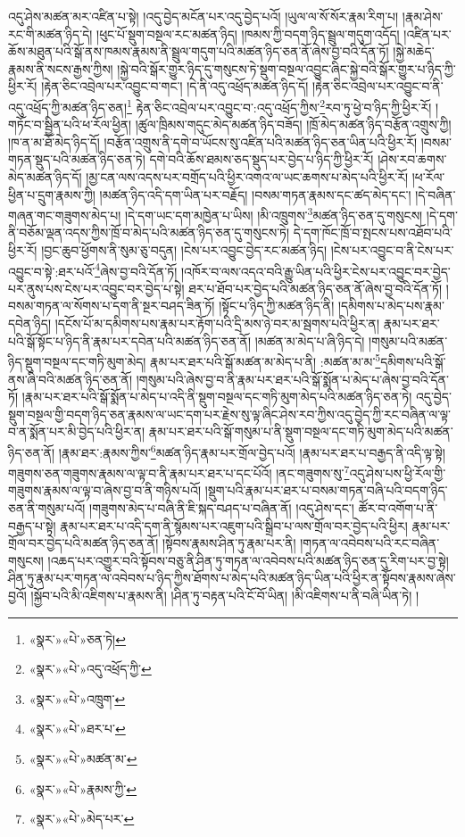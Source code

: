 འདུ་ཤེས་མཚན་མར་འཛིན་པ་སྟེ། །འདུ་བྱེད་མངོན་པར་འདུ་བྱེད་པའོ། །ཡུལ་ལ་སོ་སོར་རྣམ་རིག་པ། །རྣམ་ཤེས་རང་གི་མཚན་ཉིད་དེ། །ཕུང་པོ་སྡུག་བསྔལ་རང་མཚན་ཉིད། །ཁམས་ཀྱི་བདག་ཉིད་སྦྲུལ་གདུག་འདོད། །འཛིན་པར་ཆོས་མཐུན་པའི་སྒོ་ནས་ཁམས་རྣམས་ནི་སྦྲུལ་གདུག་པའི་མཚན་ཉིད་ཅན་ནོ་ཞེས་བྱ་བའི་དོན་ཏོ། །སྐྱེ་མཆེད་རྣམས་ནི་སངས་རྒྱས་ཀྱིས། །སྐྱེ་བའི་སྒོར་གྱུར་ཉིད་དུ་གསུངས་ཏེ་སྡུག་བསྔལ་འབྱུང་ཞིང་སྐྱེ་བའི་སྒོར་གྱུར་པ་ཉིད་ཀྱི་ཕྱིར་རོ། །རྟེན་ཅིང་འབྲེལ་པར་འབྱུང་བ་གང་། །དེ་ནི་འདུ་འཕྲོད་མཚན་ཉིད་དོ། །རྟེན་ཅིང་འབྲེལ་པར་འབྱུང་བ་ནི་འདུ་འཕྲོད་ཀྱི་མཚན་ཉིད་ཅན།\footnote{«སྣར་»«པེ་»ཅན་ཏེ།} རྟེན་ཅིང་འབྲེལ་པར་འབྱུང་བ་:འདུ་འཕྲོད་ཀྱིས་\footnote{«སྣར་»«པེ་»འདུ་འཕྲོད་ཀྱི་}རབ་ཏུ་ཕྱེ་བ་ཉིད་ཀྱི་ཕྱིར་རོ། །གཏོང་བ་སྦྱིན་པའི་ཕ་རོལ་ཕྱིན། །ཚུལ་ཁྲིམས་གདུང་མེད་མཚན་ཉིད་བཟོད། །ཁྲོ་མེད་མཚན་ཉིད་བརྩོན་འགྲུས་ཀྱི། །ཁ་ན་མ་ཐོ་མེད་ཉིད་དོ། །བརྩོན་འགྲུས་ནི་དགེ་བ་ཡོངས་སུ་འཛིན་པའི་མཚན་ཉིད་ཅན་ཡིན་པའི་ཕྱིར་རོ། །བསམ་གཏན་སྡུད་པའི་མཚན་ཉིད་ཅན་ཏེ། དགེ་བའི་ཆོས་ཐམས་ཅད་སྡུད་པར་བྱེད་པ་ཉིད་ཀྱི་ཕྱིར་རོ། །ཤེས་རབ་ཆགས་མེད་མཚན་ཉིད་དོ། །མྱ་ངན་ལས་འདས་པར་བགྲོད་པའི་ཕྱིར་འགའ་ལ་ཡང་ཆགས་པ་མེད་པའི་ཕྱིར་རོ། །ཕ་རོལ་ཕྱིན་པ་དྲུག་རྣམས་ཀྱི། །མཚན་ཉིད་འདི་དག་ཡིན་པར་བརྗོད། །བསམ་གཏན་རྣམས་དང་ཚད་མེད་དང་། །དེ་བཞིན་གཞན་གང་གཟུགས་མེད་པ། །དེ་དག་ཡང་དག་མཁྱེན་པ་ཡིས། །མི་འཁྲུགས་\footnote{«སྣར་»«པེ་»འཁྲུག་}མཚན་ཉིད་ཅན་དུ་གསུངས། །དེ་དག་ནི་བཅོམ་ལྡན་འདས་ཀྱིས་ཁྲོ་བ་མེད་པའི་མཚན་ཉིད་ཅན་དུ་གསུངས་ཏེ། དེ་དག་ཁོང་ཁྲོ་བ་སྤངས་པས་འཐོབ་པའི་ཕྱིར་རོ། །བྱང་ཆུབ་ཕྱོགས་ནི་སུམ་ཅུ་བདུན། །ངེས་པར་འབྱུང་བྱེད་རང་མཚན་ཉིད། །ངེས་པར་འབྱུང་བ་ནི་ངེས་པར་འབྱུང་བ་སྟེ་:ཐར་པའོ་\footnote{«སྣར་»«པེ་»ཐར་པ་}ཞེས་བྱ་བའི་དོན་ཏོ། །འཁོར་བ་ལས་འདའ་བའི་རྒྱུ་ཡིན་པའི་ཕྱིར་ངེས་པར་འབྱུང་བར་བྱེད་པར་ནུས་པས་ངེས་པར་འབྱུང་བར་བྱེད་པ་སྟེ། ཐར་པ་ཐོབ་པར་བྱེད་པའི་མཚན་ཉིད་ཅན་ནོ་ཞེས་བྱ་བའི་དོན་ཏོ། །བསམ་གཏན་ལ་སོགས་པ་དག་ནི་སྔར་བཤད་ཟིན་ཏོ། །སྟོང་པ་ཉིད་ཀྱི་མཚན་ཉིད་ནི། །དམིགས་པ་མེད་པས་རྣམ་དབེན་ཉིད། །དངོས་པོ་མ་དམིགས་པས་རྣམ་པར་རྟོག་པའི་དྲི་མས་ཉེ་བར་མ་སྦགས་པའི་ཕྱིར་ན། རྣམ་པར་ཐར་པའི་སྒོ་སྟོང་པ་ཉིད་ནི་རྣམ་པར་དབེན་པའི་མཚན་ཉིད་ཅན་ནོ། །མཚན་མ་མེད་པ་ཞི་ཉིད་དེ། །གསུམ་པའི་མཚན་ཉིད་སྡུག་བསྔལ་དང་གཏི་མུག་མེད། རྣམ་པར་ཐར་པའི་སྒོ་མཚན་མ་མེད་པ་ནི། :མཚན་མ་མ་\footnote{«སྣར་»«པེ་»མཚན་མ་}དམིགས་པའི་སྒོ་ནས་ཞི་བའི་མཚན་ཉིད་ཅན་ནོ། །གསུམ་པའི་ཞེས་བྱ་བ་ནི་རྣམ་པར་ཐར་པའི་སྒོ་སྨོན་པ་མེད་པ་ཞེས་བྱ་བའི་དོན་ཏོ། །རྣམ་པར་ཐར་པའི་སྒོ་སྨོན་པ་མེད་པ་འདི་ནི་སྡུག་བསྔལ་དང་གཏི་མུག་མེད་པའི་མཚན་ཉིད་ཅན་ཏེ། འདུ་བྱེད་སྡུག་བསྔལ་གྱི་བདག་ཉིད་ཅན་རྣམས་ལ་ཡང་དག་པར་རྗེས་སུ་ལྟ་ཞིང་ཤེས་རབ་ཀྱིས་འདུ་བྱེད་ཀྱི་རང་བཞིན་ལ་ལྟ་བ་ན་སྨོན་པར་མི་བྱེད་པའི་ཕྱིར་ན། རྣམ་པར་ཐར་པའི་སྒོ་གསུམ་པ་ནི་སྡུག་བསྔལ་དང་གཏི་མུག་མེད་པའི་མཚན་ཉིད་ཅན་ནོ། །རྣམ་ཐར་:རྣམས་ཀྱིས་\footnote{«སྣར་»«པེ་»རྣམས་ཀྱི་}མཚན་ཉིད་རྣམ་པར་གྲོལ་བྱེད་པའོ། །རྣམ་པར་ཐར་པ་བརྒྱད་ནི་འདི་ལྟ་སྟེ། གཟུགས་ཅན་གཟུགས་རྣམས་ལ་ལྟ་བ་ནི་རྣམ་པར་ཐར་པ་དང་པོའོ། །ནང་གཟུགས་སུ་\footnote{«སྣར་»«པེ་»མེད་པར་}འདུ་ཤེས་པས་ཕྱི་རོལ་གྱི་གཟུགས་རྣམས་ལ་ལྟ་བ་ཞེས་བྱ་བ་ནི་གཉིས་པའོ། །སྡུག་པའི་རྣམ་པར་ཐར་པ་བསམ་གཏན་བཞི་པའི་བདག་ཉིད་ཅན་ནི་གསུམ་པའོ། །གཟུགས་མེད་པ་བཞི་ནི་ཇི་སྐད་བཤད་པ་བཞིན་ནོ། །འདུ་ཤེས་དང་། ཚོར་བ་འགོག་པ་ནི་བརྒྱད་པ་སྟེ། རྣམ་པར་ཐར་པ་འདི་དག་ནི་སྙོམས་པར་འཇུག་པའི་སྒྲིབ་པ་ལས་གྲོལ་བར་བྱེད་པའི་ཕྱིར། རྣམ་པར་གྲོལ་བར་བྱེད་པའི་མཚན་ཉིད་ཅན་ནོ། །སྟོབས་རྣམས་ཤིན་ཏུ་རྣམ་པར་ནི། །གཏན་ལ་འབེབས་པའི་རང་བཞིན་གསུངས། །འཆད་པར་འགྱུར་བའི་སྟོབས་བཅུ་ནི་ཤིན་ཏུ་གཏན་ལ་འབེབས་པའི་མཚན་ཉིད་ཅན་དུ་རིག་པར་བྱ་སྟེ། ཤིན་ཏུ་རྣམ་པར་གཏན་ལ་འབེབས་པ་ཉིད་ཀྱིས་ཐོགས་པ་མེད་པའི་མཚན་ཉིད་ཡིན་པའི་ཕྱིར་ན་སྟོབས་རྣམས་ཞེས་བྱའོ། །སྐྱོབ་པའི་མི་འཇིགས་པ་རྣམས་ནི། །ཤིན་ཏུ་བརྟན་པའི་ངོ་བོ་ཡིན། །མི་འཇིགས་པ་ནི་བཞི་ཡིན་ཏེ། །
